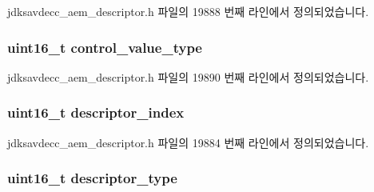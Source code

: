 jdksavdecc\+\_\+aem\+\_\+descriptor.\+h 파일의 19888 번째 라인에서 정의되었습니다.

\subsubsection[{\texorpdfstring{control\+\_\+value\+\_\+type}{control_value_type}}]{\setlength{\rightskip}{0pt plus 5cm}uint16\+\_\+t control\+\_\+value\+\_\+type}\hypertarget{structjdksavdecc__descriptor__mixer_a62a5b88a920cc4d09508de6fc60d9a63}{}\label{structjdksavdecc__descriptor__mixer_a62a5b88a920cc4d09508de6fc60d9a63}


jdksavdecc\+\_\+aem\+\_\+descriptor.\+h 파일의 19890 번째 라인에서 정의되었습니다.

\subsubsection[{\texorpdfstring{descriptor\+\_\+index}{descriptor_index}}]{\setlength{\rightskip}{0pt plus 5cm}uint16\+\_\+t descriptor\+\_\+index}\hypertarget{structjdksavdecc__descriptor__mixer_a042bbc76d835b82d27c1932431ee38d4}{}\label{structjdksavdecc__descriptor__mixer_a042bbc76d835b82d27c1932431ee38d4}


jdksavdecc\+\_\+aem\+\_\+descriptor.\+h 파일의 19884 번째 라인에서 정의되었습니다.

\subsubsection[{\texorpdfstring{descriptor\+\_\+type}{descriptor_type}}]{\setlength{\rightskip}{0pt plus 5cm}uint16\+\_\+t descriptor\+\_\+type}\hypertarget{structjdksavdecc__descriptor__mixer_ab7c32b6c7131c13d4ea3b7ee2f09b78d}{}\label{structjdksavdecc__descriptor__mixer_ab7c32b6c7131c13d4ea3b7ee2f09b78d}


